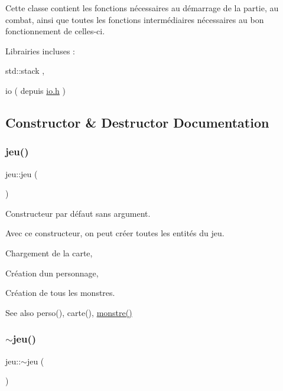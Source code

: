 Cette classe contient les fonctions nécessaires au démarrage de la partie, au combat, ainsi que toutes les fonctions intermédiaires nécessaires au bon fonctionnement de celles-\/ci.

Librairies incluses \+:
\begin{DoxyItemize}
\item std\+::stack ,
\item io ( depuis \hyperlink{io_8h}{io.\+h} ) 
\end{DoxyItemize}

\subsection{Constructor \& Destructor Documentation}
\mbox{\label{classjeu_a38513a7bfd0a7ea4e3a5612da2856016}} 
\subsubsection{\texorpdfstring{jeu()}{jeu()}}
{\footnotesize\ttfamily jeu\+::jeu (\begin{DoxyParamCaption}{ }\end{DoxyParamCaption})}



Constructeur par défaut sans argument. 

Avec ce constructeur, on peut créer toutes les entités du jeu.


\begin{DoxyItemize}
\item Chargement de la carte,
\item Création d\textquotesingle{}un personnage,
\item Création de tous les monstres.
\end{DoxyItemize}

\begin{DoxySeeAlso}{See also}
perso(), carte(), \hyperlink{classmonstre}{monstre()} 
\end{DoxySeeAlso}
\mbox{\label{classjeu_a55385a33ef40e0579eb3a3634566c4a8}} 
\subsubsection{\texorpdfstring{$\sim$jeu()}{~jeu()}}
{\footnotesize\ttfamily jeu\+::$\sim$jeu (\begin{DoxyParamCaption}{ }\end{DoxyParamCaption})}



